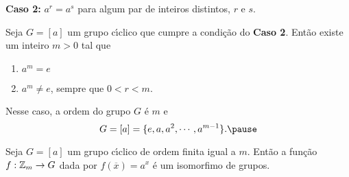 \documentclass{beamer}
\begin{document}
    \begin{frame}
        \textbf{Caso 2:} $a^r = a^s$ \pause para algum par de inteiros distintos, $r$ e $s$. \pause
    \end{frame}

    \begin{frame}
        \begin{proposicao}
            Seja $G = [a]$ um grupo c{\'\i}clico que cumpre a condi\c{c}\~ao do \textbf{Caso 2}. \pause Ent\~ao existe um inteiro $m > 0$ tal que \pause
            \begin{enumerate}
                \item[i)] $a^m = e$ \pause

                \item[ii)] $a^m \ne e$, sempre que $0 < r < m$. \pause
            \end{enumerate}
            Nesse caso, a ordem do grupo $G$ \'e $m$ \pause e
            \[
                G = [a] = \{e, a, a^2, \cdots, a^{m - 1}\}. \pause
            \]
        \end{proposicao}
    \end{frame}

    \begin{frame}
        \begin{corolario}
            Seja $G = [a]$ um grupo c{\'\i}clico de ordem finita igual a $m$. \pause Ent\~ao a fun\c{c}\~ao $f : \mathbb{Z}_m \to G$ \pause dada por $f(\overline{x}) = a^x$ \pause \'e um isomorfimo de grupos.
        \end{corolario}
    \end{frame}
\end{document}
